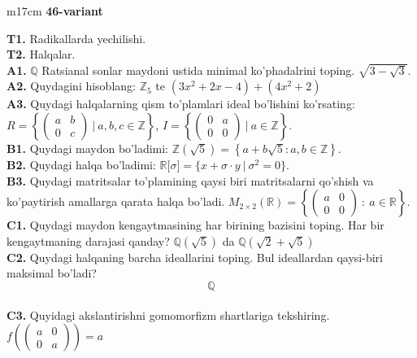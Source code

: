 \documentclass{article}
\begin{document}
\begin{tabular}{m{17cm}}
\textbf{46-variant}
\newline

\textbf{T1.} Radikallarda yechilishi. \\
\textbf{T2.} Halqalar. \\
\textbf{A1.} \(\mathbb{Q}\) Ratsianal sonlar maydoni ustida minimal ko'phadalrini toping.
\(\sqrt{3 - \sqrt{3}}\). \\
\textbf{A2.} Quydagini hisoblang:
\(\mathbb{Z}_{5}\) te \(\left( 3x^{2} + 2x - 4 \right) + \left( 4x^{2} + 2 \right)\) \\
\textbf{A3.} Quydagi halqalarning qism to'plamlari ideal bo'lishini ko'rsating: \(R = \left\{ \begin{pmatrix}
a & b \\
0 & c
\end{pmatrix}\ |\ a,b,c \in \mathbb{Z} \right\}\), \(I = \left\{ \begin{pmatrix}
0 & a \\
0 & 0
\end{pmatrix}\ |\ a \in \mathbb{Z} \right\}\). \\
\textbf{B1.} Quydagi maydon bo'ladimi:
\(\mathbb{Z}\left( \sqrt{5} \right) = \left\{ a + b\sqrt{5}:a,b \in \mathbb{Z} \right\}\). \\
\textbf{B2.} Quydagi halqa bo'ladimi:
\(\mathbb{R\lbrack}\sigma\rbrack = \{ x + \sigma \cdot y\ |\ \sigma^{2} = 0\}\). \\
\textbf{B3.} Quydagi matritsalar to'plamining qaysi biri matritsalarni qo'shish va ko'paytirish amallarga qarata halqa bo'ladi.
\(M_{2 \times 2}\mathbb{(R) =}\left\{ \begin{pmatrix}
a & 0 \\
0 & 0
\end{pmatrix}\ :\ a \in \mathbb{R} \right\}\). \\
\textbf{C1.} Quydagi maydon kengaytmasining har birining bazisini toping. Har bir kengaytmaning darajasi qanday?
\(\mathbb{Q}\left( \sqrt{5} \right)\) da \(\mathbb{Q}\left( \sqrt{2} + \sqrt{5} \right)\) \\
\textbf{C2.} Quydagi halqaning barcha ideallarini toping. Bul ideallardan qaysi-biri maksimal bo'ladi?
\[\mathbb{Q}\] \\
\textbf{C3.} Quyidagi akslantirishni gomomorfizm shartlariga tekshiring. \(f\left( \begin{pmatrix}
a & 0 \\
0 & a
\end{pmatrix} \right) = a\) \\

\end{tabular}
\vspace{1cm}
\end{document}
